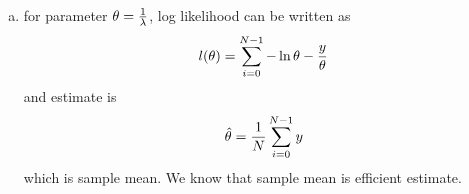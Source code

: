 \documentclass[11pt,paper=a4,answers]{exam}
\begin{document}
\begin{questions}
\begin{enumerate}[a.]
\item for parameter $\theta = {1 \over \lambda}$, log likelihood can be written as
$$l(\theta) = \sum_{i=0}^{N-1} -\ln \theta - {y \over \theta}$$
and estimate is
\begin{align}
    \hat{\theta} = {1 \over N} \sum_{i=0}^{N-1} y 
\end{align}
which is sample mean. We know that sample mean is efficient estimate.

\end{enumerate}
\end{questions}
\end{document}
